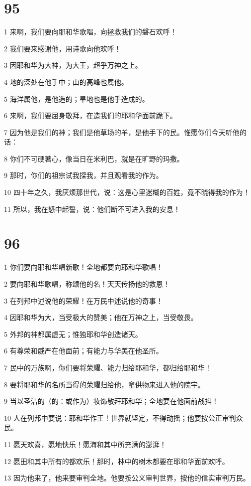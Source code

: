 \chapter{95}

\par 1 来啊，我们要向耶和华歌唱，向拯救我们的磐石欢呼！
\par 2 我们要来感谢他，用诗歌向他欢呼！
\par 3 因耶和华为大神，为大王，超乎万神之上。
\par 4 地的深处在他手中；山的高峰也属他。
\par 5 海洋属他，是他造的；旱地也是他手造成的。
\par 6 来啊，我们要屈身敬拜，在造我们的耶和华面前跪下。
\par 7 因为他是我们的神；我们是他草场的羊，是他手下的民。惟愿你们今天听他的话：
\par 8 你们不可硬著心，像当日在米利巴，就是在旷野的玛撒。
\par 9 那时，你们的祖宗试我探我，并且观看我的作为。
\par 10 四十年之久，我厌烦那世代，说：这是心里迷糊的百姓，竟不晓得我的作为！
\par 11 所以，我在怒中起誓，说：他们断不可进入我的安息！

\chapter{96}

\par 1 你们要向耶和华唱新歌！全地都要向耶和华歌唱！
\par 2 要向耶和华歌唱，称颂他的名！天天传扬他的救恩！
\par 3 在列邦中述说他的荣耀！在万民中述说他的奇事！
\par 4 因耶和华为大，当受极大的赞美；他在万神之上，当受敬畏。
\par 5 外邦的神都属虚无；惟独耶和华创造诸天。
\par 6 有尊荣和威严在他面前；有能力与华美在他圣所。
\par 7 民中的万族啊，你们要将荣耀、能力归给耶和华，都归给耶和华！
\par 8 要将耶和华的名所当得的荣耀归给他，拿供物来进入他的院宇。
\par 9 当以圣洁的（的：或作为）妆饰敬拜耶和华；全地要在他面前战抖！
\par 10 人在列邦中要说：耶和华作王！世界就坚定，不得动摇；他要按公正审判众民。
\par 11 愿天欢喜，愿地快乐！愿海和其中所充满的澎湃！
\par 12 愿田和其中所有的都欢乐！那时，林中的树木都要在耶和华面前欢呼。
\par 13 因为他来了，他来要审判全地。他要按公义审判世界，按他的信实审判万民。

